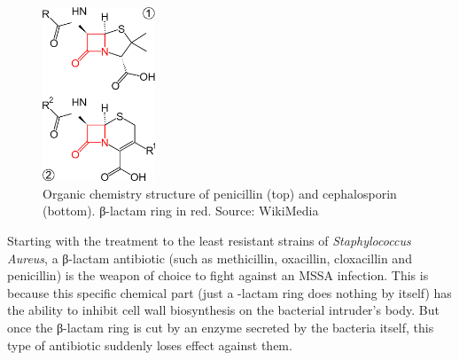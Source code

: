 \paragraph{}\begin{figure}\begin{center}\includegraphics[width=0.30\textwidth]{assets/beta-lactam.png}\end{center}\caption{Organic chemistry structure of penicillin (top) and cephalosporin (bottom). β-lactam ring in red. Source: WikiMedia}\vspace{-0.30\linewidth}\end{figure}Starting with the treatment to the least resistant strains of \emph{Staphylococcus Aureus}, a β-lactam antibiotic (such as methicillin, oxacillin, cloxacillin and penicillin) is the weapon of choice to fight against an MSSA infection. This is because this specific chemical part (just a \beta-lactam ring does nothing by itself) has the ability to inhibit cell wall biosynthesis on the bacterial intruder's body. But once the β-lactam ring is cut by an enzyme secreted by the bacteria itself, this type of antibiotic suddenly loses effect against them.
